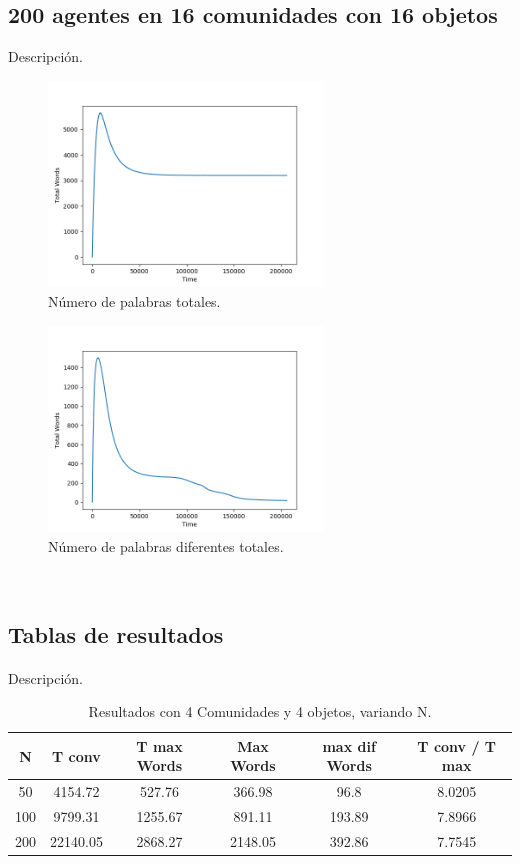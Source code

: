 \documentclass[runningheads]{llncs}
\begin{document}
\subsection{200 agentes en 16 comunidades con 16 objetos}
Descripción.
\begin{figure}[h]
	\centering
	\includegraphics[width=0.65\textwidth]{Figure_333_TotalWords.png}
	\caption{Número de palabras totales.}
	\label{fig_006}
\end{figure}
\begin{figure}[h]
	\centering
	\includegraphics[width=0.65\textwidth]{Figure_333_TotalDifferentWords.png}
	\caption{Número de palabras diferentes totales.}
	\label{fig_007}
\end{figure}
\\
\subsection{Tablas de resultados}
\paragraph{}Descripción.
\begin{table}[h]
	\centering
	\caption{Resultados con 4 Comunidades y 4 objetos, variando N.}\label{tab1}
	\begin{tabular}{|c|c|c|c|c|c|}
		\hline
		N &  T conv & T max Words & Max Words & max dif Words & T conv / T max  \\
		\hline
		50 & 4154.72 &   527.76 & 366.98 & 96.8 & 8.0205 \\
		\hline
		100 & 9799.31 &   1255.67 & 891.11 & 193.89 & 7.8966\\
		\hline
		200 & 22140.05 &  2868.27 & 2148.05 & 392.86 & 7.7545 \\
		\hline
	\end{tabular}
\end{table}
\end{document}
